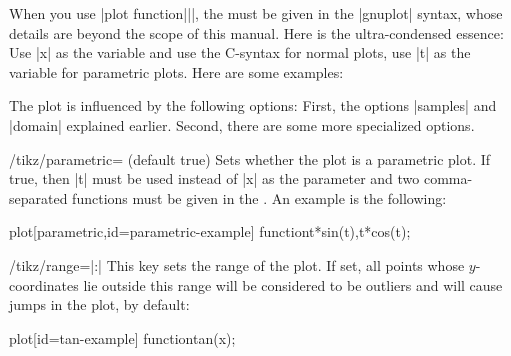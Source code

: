 When you use |plot function{||}|, the  must be given in the |gnuplot| syntax, whose details are
beyond the scope of this manual. Here is the ultra-condensed
essence: Use |x| as the variable and use the C-syntax for normal
plots, use |t| as the variable for parametric plots. Here are some examples:

\begin{codeexample}[]
\end{codeexample}


The plot is influenced by the following options: First, the options
|samples| and |domain| explained earlier. Second, there are some more
specialized options.

\begin{key}{/tikz/parametric= (default true)}
  Sets whether the plot is a parametric plot. If true, then |t| must
  be used instead of |x| as the parameter and two comma-separated
  functions must be given in the . An example is
  the following:
\begin{codeexample}[]
\tikz \draw[scale=0.5,domain=-3.141:3.141,smooth]
  plot[parametric,id=parametric-example] function{t*sin(t),t*cos(t)};
\end{codeexample}
\end{key}

\begin{key}{/tikz/range=|:|}
  This key sets the range of the plot. If set, all points whose
  $y$-coordinates lie outside this range will be considered to be
  outliers and will cause jumps in the plot, by default:
\begin{codeexample}[]
\tikz \draw[scale=0.5,domain=-3.141:3.141, samples=100, smooth, range=-3:3]
  plot[id=tan-example] function{tan(x)};
\end{codeexample}
\end{key}

